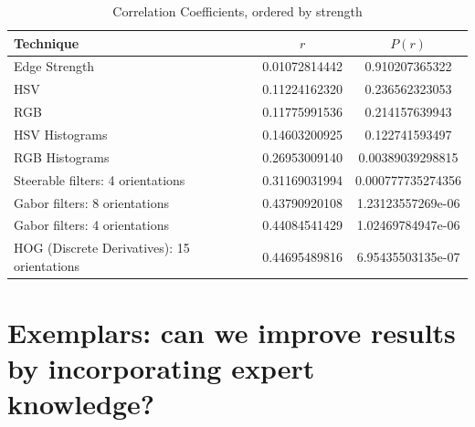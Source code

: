 \documentclass[conference,a4paper]{IEEEtran}
\begin{document}
\begin{table}[h]
\centering
\begin{tabular}{|p{3.5cm}|c|c|}
\hline
Technique     & $r$ & $P(r)$ \\ \hline
Edge Strength					& 0.01072814442	& 0.910207365322    \\
HSV						& 0.11224162320	& 0.236562323053    \\
RGB						& 0.11775991536	& 0.214157639943    \\
HSV Histograms					& 0.14603200925	& 0.122741593497    \\
RGB Histograms					& 0.26953009140	& 0.00389039298815  \\
Steerable filters: 4 orientations		& 0.31169031994	& 0.000777735274356 \\
Gabor filters: 8 orientations			& 0.43790920108	& 1.23123557269e-06 \\
Gabor filters: 4 orientations			& 0.44084541429	& 1.02469784947e-06 \\
HOG (Discrete Derivatives): 15 orientations	& 0.44695489816	& 6.95435503135e-07 \\

\hline
\end{tabular}
\vspace{0.5em}
\caption{Correlation Coefficients, ordered by strength}\label{tab:results}
\end{table}



\section{Exemplars: can we improve results by incorporating expert knowledge? }
\end{document}
